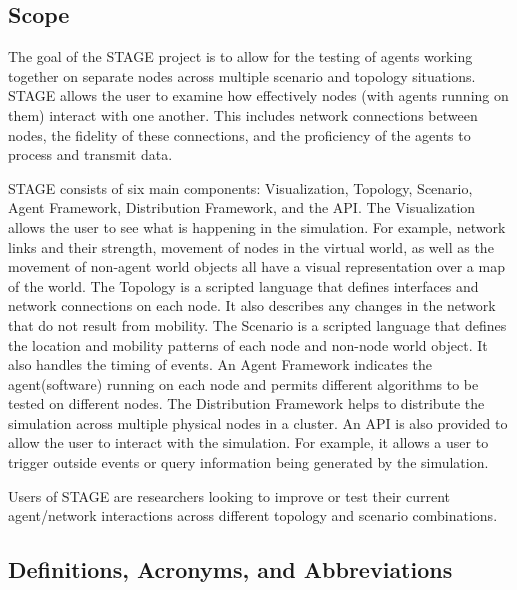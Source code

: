\documentclass[titlepage]{article}
\begin{document}

\subsection{Scope%
  \label{scope}%
}

The goal of the STAGE project is to allow for the testing of agents working together on separate nodes across multiple scenario and topology situations.  STAGE allows the user to examine how effectively nodes (with agents running on them) interact with one another.  This includes network connections between nodes, the fidelity of these connections, and the proficiency of the agents to process and transmit data.

STAGE consists of six main components: Visualization, Topology, Scenario, Agent Framework, Distribution Framework, and the API.  The Visualization allows the user to see what is happening in the simulation.  For example, network links and their strength, movement of nodes in the virtual world, as well as the movement of non-agent world objects all have a visual representation over a map of the world.  The Topology is a scripted language that defines interfaces and network connections on each node.  It also describes any changes in the network that do not result from mobility.  The Scenario is a scripted language that defines the location and mobility patterns of each node and non-node world object. It also handles the timing of events. An Agent Framework indicates the agent(software) running on each node and permits different algorithms to be tested on different nodes.  The Distribution Framework helps to distribute the simulation across multiple physical nodes in a cluster.  An API is also provided to allow the user to interact with the simulation.  For example, it allows a user to trigger outside events or query information being generated by the simulation. 

Users of STAGE are researchers looking to improve or test their current agent/network interactions across different topology and scenario combinations.  

\subsection{Definitions, Acronyms, and Abbreviations%
  \label{definitions}%
}
\end{document}
